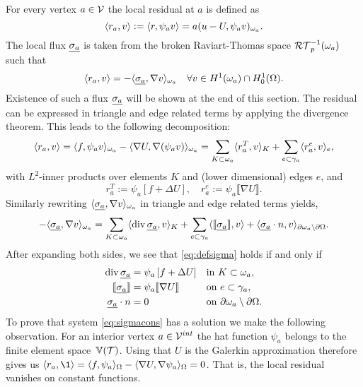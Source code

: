 \documentclass[thesis.tex]{subfiles}
\begin{document}
For every vertex $a \in \mathcal{V}$ the local residual at $a$ is defined as
\[
  \langle r_a,v \rangle := \langle r,\psi_a v \rangle = a(u - U, \psi_a v)_{\omega_a}.
\]
The local flux $\underline{\sigma_a}$ is taken from the broken Raviart-Thomas space $\mathcal{RT}_{p}^{-1}(\omega_a)$ such that
\begin{equation}
  \label{eq:defsigma}
  \langle r_a, v \rangle = - \langle \underline{\sigma_a}, \nabla v \rangle_{\omega_a} \quad \forall v \in H^1(\omega_a) \cap H_0^1(\Omega).
\end{equation}
Existence of such a flux $\underline{\sigma_a}$ will be shown at the end of this section.
The residual can be expressed in triangle and edge related terms by applying the divergence theorem.
This leads to the following decomposition:
\begin{equation}
  \label{eq:locdecomp}
  \langle r_a,v \rangle = \langle f, \psi_a v \rangle_{\omega_a} - \langle \nabla U, \nabla (\psi_av) \rangle_{\omega_a} = \sum_{ K\subset \omega_a} \langle{r^T_a, v}\rangle_K + \sum_{ e \subset \gamma_a} \langle r^e_a, v \rangle_e,
\end{equation}
with $L^2$-inner products over elements $K$ and (lower dimensional) edges $e$, and
\[
  r^T_a := \psi_a \left[ f + \Delta U \right], \quad r^e_a := \psi_a \llbracket \nabla U \rrbracket.
\]
Similarly rewriting $\langle \underline{\sigma_a}, \nabla v \rangle_{\omega_a}$ in triangle and edge related terms yields,
\[
  -\langle \underline{\sigma_a}, \nabla v \rangle_{\omega_a} = \sum_{K \subset \omega_a} \langle \operatorname{div} \underline{\sigma_a}, v \rangle_K + \sum_{ e\subset \gamma_a} \langle \llbracket \underline{\sigma_a}\rrbracket, v \rangle + \langle \underline{\sigma_a}\cdot n, v \rangle_{\partial \omega_a \setminus \partial \Omega}.
\]
After expanding both sides, we see that \eqref{eq:defsigma} holds if and only if
\begin{equation}
  \label{eq:sigmacons}
  \begin{alignedat}{3}
    \operatorname{div} \underline{\sigma_a} &= \psi_a \left [f + \Delta U\right] && \quad\text{in }  K\subset \omega_a ,\\
    \llbracket \underline{\sigma_a} \rrbracket &= \psi_a \llbracket \nabla U \rrbracket && \quad \text{on } e \subset \gamma_a,\\
    \underline{\sigma_a} \cdot n &= 0 &&\quad \text{on } \partial \omega_a \setminus \partial \Omega.
  \end{alignedat}
\end{equation}
To prove that system \eqref{eq:sigmacons} has a solution we make the following observation.
For an interior vertex $a \in \mathcal{V}^{int}$ the hat function $\psi_a$ belongs to the finite element space~$\mathbb{V}(\mathcal{T})$. 
Using that $U$ is the Galerkin approximation therefore gives us $\ip{r_a,\1} = \ip{f, \psi_a}_\O - \ip{\nabla U, \nabla \psi_a}_{\O} = 0$.
That is, the local residual vanishes on constant functions.
\end{document}
